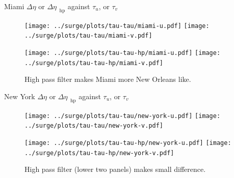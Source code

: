 \documentclass[usenames, dvipsnames]{beamer}
\begin{document}
\begin{frame}{Miami $\Delta\eta$ or $\Delta\eta_{\;\;\mathrm{hp}}$ against $\tau_u$, or $\tau_v$}
\vspace{-30pt}
\hspace{-30pt}
 \begin{minipage}{1.1\textwidth}
\begin{figure}[htb!]
    \centering
   \hspace{-40pt} \texttt{[image: ../surge/plots/tau-tau/miami-u.pdf]}
        \texttt{[image: ../surge/plots/tau-tau/miami-v.pdf]}

   \hspace{-40pt} \texttt{[image: ../surge/plots/tau-tau-hp/miami-u.pdf]}
        \texttt{[image: ../surge/plots/tau-tau-hp/miami-v.pdf]}
    \vspace{-15pt}
    \caption{High pass filter makes Miami more New Orleans like.}
    \label{fig:A}
\end{figure}
\end{minipage}
\end{frame}


\begin{frame}{New York $\Delta\eta$ or
              $\Delta\eta_{\;\;\mathrm{hp}}$ against $\tau_u$, or $\tau_v$}
\vspace{-30pt}
\hspace{-30pt}
 \begin{minipage}{1.1\textwidth}
\begin{figure}[htb!]
    \centering
   \hspace{-40pt} \texttt{[image: ../surge/plots/tau-tau/new-york-u.pdf]}
        \texttt{[image: ../surge/plots/tau-tau/new-york-v.pdf]}

   \hspace{-40pt} \texttt{[image: ../surge/plots/tau-tau-hp/new-york-u.pdf]}
        \texttt{[image: ../surge/plots/tau-tau-hp/new-york-v.pdf]}
    \vspace{-15pt}
    \caption{High pass filter (lower two panels) makes small difference.}
    \label{fig:A}
\end{figure}
\end{minipage}
\end{frame}
\end{document}
